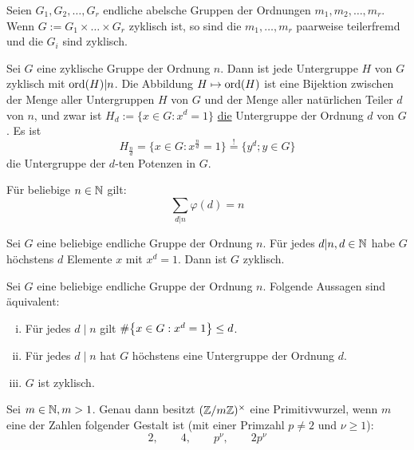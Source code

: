 \begin{falko} \label{F4.5}
	Seien $G_1,G_2,\dots,G_r$ endliche abelsche Gruppen der Ordnungen $m_1,m_2,\dots,m_r$. Wenn $G:= G_1 \times \dots \times G_r$ zyklisch ist, so sind die $m_1,\dots,m_r$ paarweise teilerfremd und die $G_i$ sind zyklisch.
\end{falko}

\begin{falko} \label{F4.6}
	Sei $G$ eine zyklische Gruppe der Ordnung $n$. Dann ist jede Untergruppe $H$ von $G$ zyklisch mit $\operatorname{ord}(H) | n$. Die Abbildung $H \mapsto \operatorname{ord}(H)$ ist eine Bijektion zwischen der Menge aller Untergruppen $H$ von $G$ und der Menge aller natürlichen Teiler $d$ von $n$, und zwar ist $H_d := \{x \in G : x^d = 1\}$ \underline{die} Untergruppe der Ordnung $d$ von $G$. Es ist
	\[ H_{\frac{n}{d}} = \{x \in G : x^{\frac{n}{d}}=1 \} \overset{!}{=} \{y^d ; y \in G\} \]
	die Untergruppe der $d$-ten Potenzen in $G$.
\end{falko}

	Für beliebige $n \in \mathbb{N}$ gilt:
	\[ \sum_{d | n} \varphi(d) = n \]
	
	Sei $G$ eine beliebige endliche Gruppe der Ordnung $n$. Für jedes $d | n, d \in \mathbb{N}$ habe $G$ höchstens $d$ Elemente $x$ mit $x^d = 1$. Dann ist $G$ zyklisch.
	
\begin{falko} \label{F4.7}
	Sei $G$ eine beliebige endliche Gruppe der Ordnung $n$. Folgende Aussagen sind äquivalent:
	\begin{enumerate}[(i)]
		\item Für jedes $d \mid n$ gilt $\#\penbrace*{x \in G : x^d = 1} \leq d$.
		\item Für jedes $d \mid n$ hat $G$ höchstens eine Untergruppe der Ordnung $d$.
		\item $G$ ist zyklisch.
	\end{enumerate}
\end{falko}
	
\begin{satz} \label{satz_4.4}
	Sei $m \in \mathbb{N}, m > 1$. Genau dann besitzt $(\mathbb{Z}/m\mathbb{Z})^\times$ eine Primitivwurzel, wenn $m$ eine der Zahlen folgender Gestalt ist (mit einer Primzahl $p \neq 2$ und $\nu \geq 1$):
	\[ 2, \qquad 4, \qquad p^\nu, \qquad 2p^\nu \]
\end{satz}
\newpage